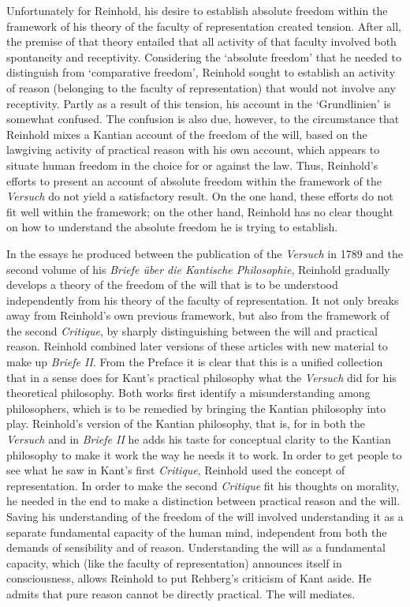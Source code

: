  Unfortunately for Reinhold, his desire to establish absolute freedom within the framework of his theory of the faculty of representation created tension. After all, the premise of that theory entailed that all activity of that faculty involved both spontaneity and receptivity. Considering the `absolute freedom' that he needed to distinguish from `comparative freedom', Reinhold sought to establish an activity of reason (belonging to the faculty of representation) that would not involve any receptivity. Partly as a result of this tension, his account in the `Grundlinien' is somewhat confused. The confusion is also due, however, to the circumstance that Reinhold mixes a Kantian account of the freedom of the will, based on the lawgiving activity of practical reason with his own account, which appears to situate human freedom in the choice for or against the law. Thus, Reinhold's efforts to present an account of absolute freedom within the framework of the \textit{Versuch} do not yield a satisfactory result. On the one hand, these efforts do not fit well within the framework; on the other hand, Reinhold has no clear thought on how to understand the absolute freedom he is trying to establish. 

 In the essays he produced between the publication of the \textit{Versuch} in 1789 and the second volume of his \textit{Briefe \"{u}ber die Kantische Philosophie}, Reinhold gradually develops a theory of the freedom of the will that is to be understood independently from his theory of the faculty of representation. It not only breaks away from Reinhold's own previous framework, but also from the framework of the second \textit{Critique}, by sharply distinguishing between the will and practical reason. Reinhold combined later versions of these articles with new material to make up \textit{Briefe II}. From the Preface it is clear that this is a unified collection that in a sense does for Kant's practical philosophy what the \textit{Versuch} did for his theoretical philosophy. Both works first identify a misunderstanding among philosophers, which is to be remedied by bringing the Kantian philosophy into play. Reinhold's version of the Kantian philosophy, that is, for in both the \textit{Versuch} and in \textit{Briefe II} he adds his taste for conceptual clarity to the Kantian philosophy to make it work the way he needs it to work. In order to get people to see what he saw in Kant's first \textit{Critique}, Reinhold used the concept of representation. In order to make the second \textit{Critique} fit his thoughts on morality, he needed in the end to make a distinction between practical reason and the will. Saving his understanding of the freedom of the will involved understanding it as a separate fundamental capacity of the human mind, independent from both the demands of sensibility and of reason. Understanding the will as a fundamental capacity, which (like the faculty of representation) announces itself in consciousness, allows Reinhold to put Rehberg's criticism of Kant aside. He admits that pure reason cannot be directly practical. The will mediates. 

